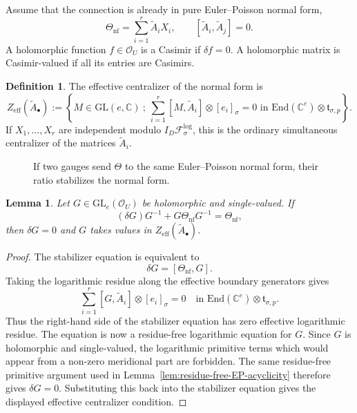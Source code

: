 \documentclass[11pt]{amsart}
\theoremstyle{plain}
\newtheorem{lemma}[theorem]{Lemma}
\theoremstyle{definition}
\newtheorem{definition}[theorem]{Definition}
\newcommand{\fol}{\mathcal{F}}
\newcommand{\GL}{\mathrm{GL}}
\theoremstyle{definition}
\newcommand{\C}{\mathbb{C}}
\newcommand{\OO}{\mathcal{O}}
\newcommand{\End}{\mathrm{End}}
\begin{document}
Assume that the connection is already in pure Euler--Poisson normal form,
\[
        \Theta_{\mathrm{nf}}
        =
        \sum_{i=1}^r \widetilde A_iX_i,
        \qquad
        [\widetilde A_i,\widetilde A_j]=0.
\]
A holomorphic function $f\in\OO_U$ is a Casimir if $\delta f=0$.  A holomorphic
matrix is Casimir-valued if all its entries are Casimirs.

\begin{definition}\label{def:centralizer}
The effective centralizer of the normal form is
\[
        Z_{\mathrm{eff}}(\widetilde A_\bullet)
        :=
        \left\{
        M\in\GL(e,\C)
        \ ;\
        \sum_{i=1}^r [M,\widetilde A_i]\otimes [e_i]_\sigma=0
        \text{ in }\End(\C^e)\otimes\mathfrak t_{\sigma,p}
        \right\}.
\]
If $X_1,\ldots,X_r$ are independent modulo $I_D\fol_\sigma^{\log}$, this is the
ordinary simultaneous centralizer of the matrices $\widetilde A_i$.
\end{definition}

\begin{figure}[t]
\centering
{}
\caption{If two gauges send $\Theta$ to the same Euler--Poisson normal form, their ratio stabilizes the normal form.}
\label{fig:uniq-torsor}
\end{figure}

\begin{lemma}\label{lem:casimir-centralizer-rigidity}
Let $G\in\GL_e(\OO_U)$ be holomorphic and single-valued.  If
\[
        (\delta G)G^{-1}+G\Theta_{\mathrm{nf}}G^{-1}=\Theta_{\mathrm{nf}},
\]
then $\delta G=0$ and $G$ takes values in
$Z_{\mathrm{eff}}(\widetilde A_\bullet)$.
\end{lemma}

\begin{proof}
The stabilizer equation is equivalent to
\[
        \delta G=[\Theta_{\mathrm{nf}},G].
\]
Taking the logarithmic residue along the effective boundary generators gives
\[
        \sum_{i=1}^r [G,\widetilde A_i]\otimes [e_i]_\sigma=0
        \quad\text{in }\End(\C^e)\otimes\mathfrak t_{\sigma,p}.
\]
Thus the right-hand side of the stabilizer equation has zero effective
logarithmic residue.  The equation is now a residue-free logarithmic equation
for $G$.  Since $G$ is holomorphic and single-valued, the logarithmic primitive
terms which would appear from a non-zero meridional part are forbidden.  The
same residue-free primitive argument used in Lemma~\ref{lem:residue-free-EP-acyclicity}
therefore gives $\delta G=0$.  Substituting this back into the stabilizer
equation gives the displayed effective centralizer condition.
\end{proof}
\end{document}
